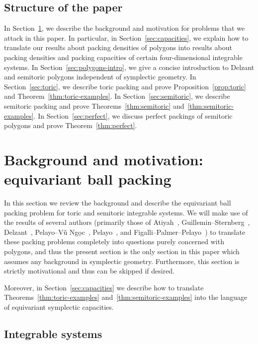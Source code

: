 \documentclass[10pt,a4paper]{amsart}
\numberwithin{equation}{section}
\theoremstyle{definition}
\theoremstyle{plain}
\theoremstyle{plain}
\begin{document}
\subsection{Structure of the paper}
In Section~\ref{sec:symplectic-background}, we describe the background and motivation for problems that we attack in this paper.
In particular, in Section~\ref{sec:capacities}, we explain how to translate our results about packing densities of polygons into results about packing densities and packing capacities of certain four-dimensional integrable systems.
In Section~\ref{sec:polygons-intro}, we give a concise introduction to Delzant and semitoric polygons independent of symplectic geometry.
In Section~\ref{sec:toric}, we describe toric packing and prove Proposition~\ref{prop:toric} and Theorem~\ref{thm:toric-examples}.
In Section~\ref{sec:semitoric}, we describe semitoric packing and prove Theorems~\ref{thm:semitoric} and~\ref{thm:semitoric-examples}.
In Section~\ref{sec:perfect}, we discuss perfect packings of semitoric polygons and prove Theorem~\ref{thm:perfect}.



\section{Background and motivation: equivariant ball packing}
\label{sec:symplectic-background}

In this section we review the background and describe the equivariant ball packing problem for toric and semitoric integrable systems.
We will make use of the results of several authors (primarily those of Atiyah~\cite{Atiyah}, Guillemin--Sternberg~\cite{GuSt1982}, Delzant~\cite{De1988}, Pelayo--V\~{u} Ng\d{o}c~\cite{PeVN2009,PeVN2011}, Pelayo~\cite{Pe2006,Pe2007}, and Figalli--Palmer--Pelayo~\cite{FiPaPe2016}) to translate these packing problems completely into questions purely concerned with polygons, and thus the present section is the only section in this paper which assumes any background in symplectic geometry.
Furthermore, this section is strictly motivational and thus can be skipped if desired.

Moreover, in Section~\ref{sec:capacities} we describe how to translate Theorems~\ref{thm:toric-examples} and~\ref{thm:semitoric-examples} into the language of equivariant symplectic capacities.



\subsection{Integrable systems}
\end{document}
